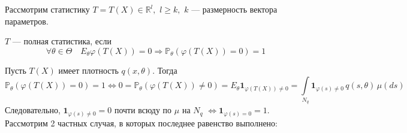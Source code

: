 \documentclass[12pt, russian]{article}
\begin{document}
Рассмотрим статистику $T=T(X)\in\mathbb{R}^l,\,\,l\geq k,\,\,k$ --- размерность вектора параметров.
\begin{mydef}
$T$ --- полная статистика, если 
$$ \forall\theta\in\Theta\quad E_\theta\varphi(T(X)) = 0 \Longrightarrow \mathbb{P}_\theta(\varphi(T(X)) = 0) = 1$$
\end{mydef}

Пусть $T(X)$ имеет плотность $q(x, \theta)$. Тогда 
$$ \mathbb{P}_\theta(\varphi(T(X)) = 0) = 1 \Longleftrightarrow 0 = \mathbb{P}_\theta(\varphi(T(X)) \not= 0) = E_\theta\mathbf{1}_{\varphi(T(X)) \not= 0} = \int\limits_{N_q}{\mathbf{1}_{\varphi(s) \not= 0}\,q(s,\theta)\,\mu(ds)}$$
Следовательно, $\mathbf{1}_{\varphi(s) \not= 0} = 0$ почти всюду по $\mu$ на $N_q$ $\Longleftrightarrow \mathbf{1}_{\varphi(s) = 0} = 1$.
Рассмотрим 2 частных случая, в которых последнее равенство выполнено:
\end{document}
